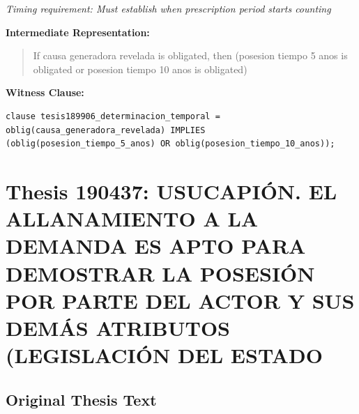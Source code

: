 \documentclass[11pt,a4paper]{article}
\begin{document}
\textit{Timing requirement: Must establish when prescription period starts counting}

\textbf{Intermediate Representation:}

\begin{quote}
If causa generadora revelada is obligated, then (posesion tiempo 5 anos is obligated or posesion tiempo 10 anos is obligated)
\end{quote}

\textbf{Witness Clause:}

\begin{lstlisting}[style=witnessstyle, language=Witness]
clause tesis189906_determinacion_temporal = oblig(causa_generadora_revelada) IMPLIES (oblig(posesion_tiempo_5_anos) OR oblig(posesion_tiempo_10_anos));
\end{lstlisting}

\newpage

\section{Thesis 190437: USUCAPIÓN. EL ALLANAMIENTO A LA DEMANDA ES APTO PARA DEMOSTRAR LA POSESIÓN POR PARTE DEL ACTOR Y SUS DEMÁS ATRIBUTOS (LEGISLACIÓN DEL ESTADO}
\label{thesis:190437}

\subsection{Original Thesis Text}
\end{document}
